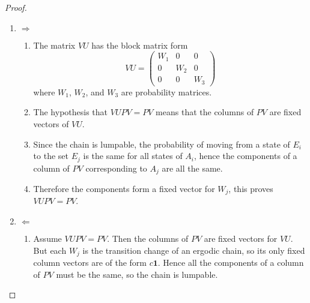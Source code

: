 \documentclass[12pt]{article}
\begin{document}
\begin{proof}
    \begin{enumerate}
        \item
            \( \Rightarrow \)
            \begin{enumerate}
                \item
                    The matrix \( VU \) has the block matrix form
                    \[
                        VU =
                        \begin{pmatrix}
                            W_1 & 0 & 0 \\
                            0 & W_2 & 0 \\
                            0 & 0 & W_3
                        \end{pmatrix}
                    \] where \( W_1 \), \( W_2 \), and \( W_3 \) are
                    probability matrices.
                \item
                    The hypothesis that \( VUPV = PV \) means that the
                    columns of \( PV \) are fixed vectors of \( VU \).
                \item
                    Since the chain is lumpable, the probability of
                    moving from a state of \( E_i \) to the set \( E_j \)
                    is the same for all states of \( A_i \), hence the
                    components of a column of \( PV \) corresponding to \(
                    A_j \) are all the same.
                \item
                    Therefore the components form a fixed vector for \(
                    W_j \), this proves \( VUPV = PV \).
            \end{enumerate}
        \item
            \( \Leftarrow \)
            \begin{enumerate}
                \item
                    Assume \( VUPV = PV \).  Then the columns of \( PV \)
                    are fixed vectors for \( VU \).  But each \( W_j \)
                    is the transition change of an ergodic chain, so its
                    only fixed column vectors are of the form \( c
                    \mathbf{1} \).  Hence all the components of a column
                    of \( PV \) must be the same, so the chain is
                    lumpable.
            \end{enumerate}
    \end{enumerate}
\end{proof}
\end{document}
